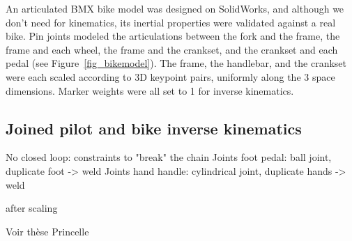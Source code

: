 An articulated BMX bike model was designed on SolidWorks, and although we don't need for kinematics, its inertial properties were validated against a real bike. Pin joints modeled the articulations between the fork and the frame, the frame and each wheel, the frame and the crankset, and the crankset and each pedal (see Figure~\ref{fig_bikemodel}). The frame, the handlebar, and the crankset were each scaled according to 3D keypoint pairs, uniformly along the 3 space dimensions. Marker weights were all set to 1 for inverse kinematics.


\subsection{Joined pilot and bike inverse kinematics}
No closed loop: constraints to "break" the chain
Joints foot pedal: ball joint, duplicate foot -> weld
Joints hand handle: cylindrical joint, duplicate hands -> weld

after scaling



Voir thèse Princelle 










